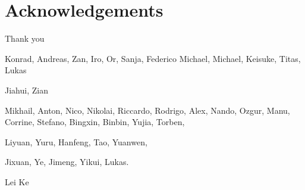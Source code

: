 
\chapter*{Acknowledgements}
\label{chap:acknowledgements}

Thank you 


Konrad, Andreas, Zan, Iro, Or, Sanja, Federico
Michael,  Michael,  Keisuke, Titas, Lukas

Jiahui, Zian 

Mikhail, Anton, Nico, Nikolai, Riccardo, Rodrigo, Alex, Nando, Ozgur, Manu, Corrine, Stefano, Bingxin, Binbin, Yujia, Torben, 

Liyuan, Yuru, Hanfeng, Tao, Yuanwen, 

Jixuan, Ye, Jimeng, Yikui, Lukas. 

Lei Ke